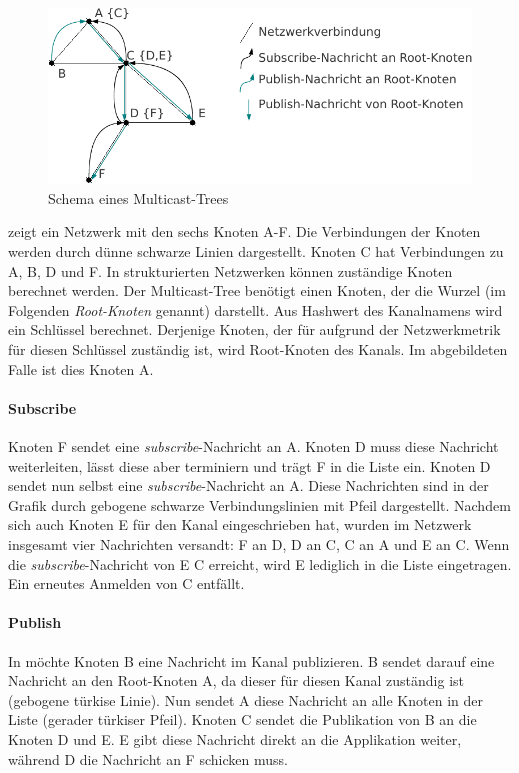 \begin{figure}[htbp]
\centering
\includegraphics{grafics/multicast_tree.pdf}
\caption{Schema eines Multicast-Trees}
\label{fig:multicast_tree}
\end{figure}

 zeigt ein Netzwerk mit den sechs Knoten A-F. Die Verbindungen der Knoten werden durch dünne schwarze Linien dargestellt. Knoten C hat Verbindungen zu A, B, D und F. In strukturierten Netzwerken können zuständige Knoten berechnet werden. Der Multicast-Tree benötigt einen Knoten, der die Wurzel (im Folgenden \emph{Root-Knoten} genannt) darstellt. Aus Hashwert des Kanalnamens wird ein Schlüssel berechnet. Derjenige Knoten, der für aufgrund der Netzwerkmetrik für diesen Schlüssel zuständig ist, wird Root-Knoten des Kanals. Im abgebildeten Falle ist dies Knoten A.

\paragraph*{Subscribe} Knoten F sendet eine \emph{subscribe}-Nachricht an A. Knoten D muss diese Nachricht weiterleiten, lässt diese aber terminiern und trägt F in die Liste ein. Knoten D sendet nun selbst eine \emph{subscribe}-Nachricht an A. Diese Nachrichten sind in der Grafik durch gebogene schwarze Verbindungslinien mit Pfeil dargestellt. Nachdem sich auch Knoten E für den Kanal eingeschrieben hat, wurden im Netzwerk insgesamt vier Nachrichten versandt: F an D, D an C, C an A und E an C. Wenn die \emph{subscribe}-Nachricht von E C erreicht, wird E lediglich in die Liste eingetragen. Ein erneutes Anmelden von C entfällt.

\paragraph*{Publish} In  möchte Knoten B eine Nachricht im Kanal publizieren. B sendet darauf eine Nachricht an den Root-Knoten A, da dieser für diesen Kanal zuständig ist (gebogene türkise Linie). Nun sendet A diese Nachricht an alle Knoten in der Liste (gerader türkiser Pfeil). Knoten C sendet die Publikation von B an die Knoten D und E. E gibt diese Nachricht direkt an die Applikation weiter, während D die Nachricht an F schicken muss.

